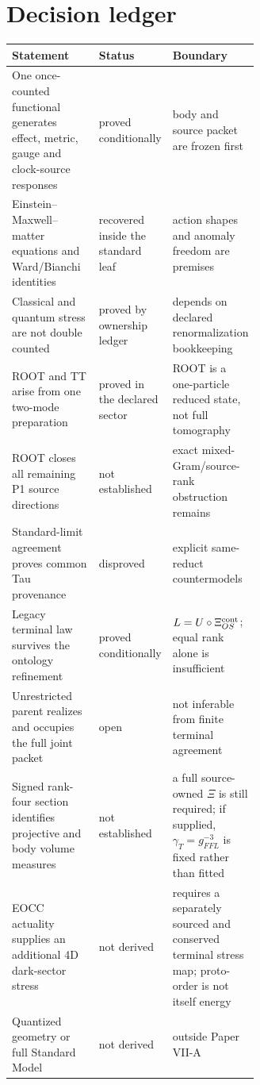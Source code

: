 \documentclass[11pt]{article}
\begin{document}
\section{Decision ledger}

\begin{center}\small
\begin{tabularx}{0.96\linewidth}{@{}p{0.42\linewidth}p{0.20\linewidth}X@{}}
\toprule
Statement & Status & Boundary\\
\midrule
One once-counted functional generates effect, metric, gauge and clock-source
responses & proved conditionally & body and source packet are frozen first\\
Einstein--Maxwell--matter equations and Ward/Bianchi identities & recovered
inside the standard leaf & action shapes and anomaly freedom are premises\\
Classical and quantum stress are not double counted & proved by ownership
ledger & depends on declared renormalization bookkeeping\\
ROOT and TT arise from one two-mode preparation & proved in the declared sector
& ROOT is a one-particle reduced state, not full tomography\\
ROOT closes all remaining P1 source directions & not established & exact
mixed-Gram/source-rank obstruction remains\\
Standard-limit agreement proves common Tau provenance & disproved & explicit
same-reduct countermodels\\
Legacy terminal law survives the ontology refinement & proved conditionally &
$L=U\circ\Xi_{OS}^{\rm cont}$; equal rank alone is insufficient\\
Unrestricted parent realizes and occupies the full joint packet & open & not
inferable from finite terminal agreement\\
Signed rank-four section identifies projective and body volume measures & not
established & a full source-owned $\Xi$ is still required; if supplied,
$\gamma_T=g_{FFL}^{-3}$ is fixed rather than fitted\\
EOCC actuality supplies an additional 4D dark-sector stress & not derived &
requires a separately sourced and conserved terminal stress map; proto-order
is not itself energy\\
Quantized geometry or full Standard Model & not derived & outside Paper VII-A\\
\bottomrule
\end{tabularx}
\end{center}
\end{document}

